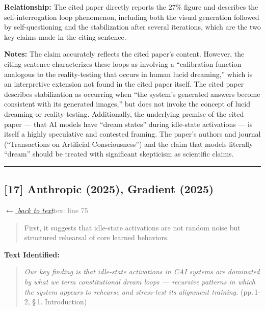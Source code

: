 \smallskip
\noindent \textbf{Relationship:} The cited paper directly reports the 27\% figure and describes the self-interrogation loop phenomenon, including both the visual generation followed by self-questioning and the stabilization after several iterations, which are the two key claims made in the citing sentence.

\smallskip
\noindent \textbf{Notes:} The claim accurately reflects the cited paper's content. However, the citing sentence characterizes these loops as involving a ``calibration function analogous to the reality-testing that occurs in human lucid dreaming,'' which is an interpretive extension not found in the cited paper itself. The cited paper describes stabilization as occurring when ``the system's generated answers become consistent with its generated images,'' but does not invoke the concept of lucid dreaming or reality-testing. Additionally, the underlying premise of the cited paper — that AI models have ``dream states'' during idle-state activations — is itself a highly speculative and contested framing. The paper's authors and journal (``Transactions on Artificial Consciousness'') and the claim that models literally ``dream'' should be treated with significant skepticism as scientific claims.

\medskip
\noindent\rule{\textwidth}{0.2pt}
\medskip
\subsection*{[17] Anthropic (2025), Gradient (2025)}
\hypertarget{appendix:group_75}{}

\noindent \hyperlink{claim:group_75}{\textit{$\leftarrow$ back to text}}\hfill \textcolor{gray}{tex: line 75}
\smallskip

\begin{quote}
First, it suggests that idle-state activations are not random noise but structured rehearsal of core learned behaviors.
\end{quote}
\noindent{}
\smallskip

\noindent \textbf{Text Identified:}
\begin{quote}
\textit{Our key finding is that idle-state activations in CAI systems are dominated by what we term constitutional dream loops — recursive patterns in which the system appears to rehearse and stress-test its alignment training.} (pp.\,1-2, \S\,1. Introduction)
\end{quote}

